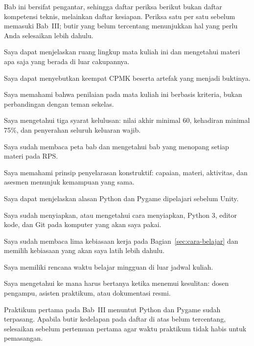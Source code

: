 
Bab ini bersifat pengantar, sehingga daftar periksa berikut bukan daftar
kompetensi teknis, melainkan daftar kesiapan. Periksa satu per satu sebelum
memasuki Bab~III; butir yang belum tercentang menunjukkan hal yang perlu Anda
selesaikan lebih dahulu.

\begin{checklistbox}
\begin{checklist}
  \item Saya dapat menjelaskan ruang lingkup mata kuliah ini dan mengetahui
        materi apa saja yang berada di luar cakupannya.
  \item Saya dapat menyebutkan keempat CPMK beserta artefak yang menjadi
        buktinya.
  \item Saya memahami bahwa penilaian pada mata kuliah ini berbasis kriteria,
        bukan perbandingan dengan teman sekelas.
  \item Saya mengetahui tiga syarat kelulusan: nilai akhir minimal 60,
        kehadiran minimal 75\%, dan penyerahan seluruh keluaran wajib.
  \item Saya sudah membaca peta bab dan mengetahui bab yang menopang setiap
        materi pada RPS.
  \item Saya memahami prinsip penyelarasan konstruktif: capaian, materi,
        aktivitas, dan asesmen menunjuk kemampuan yang sama.
  \item Saya dapat menjelaskan alasan Python dan Pygame dipelajari sebelum
        Unity.
  \item Saya sudah menyiapkan, atau mengetahui cara menyiapkan, Python 3,
        editor kode, dan Git pada komputer yang akan saya pakai.
  \item Saya sudah membaca lima kebiasaan kerja pada
        Bagian~\ref{sec:cara-belajar} dan memilih kebiasaan yang akan saya
        latih lebih dahulu.
  \item Saya memiliki rencana waktu belajar mingguan di luar jadwal kuliah.
  \item Saya mengetahui ke mana harus bertanya ketika menemui kesulitan:
        dosen pengampu, asisten praktikum, atau dokumentasi resmi.
\end{checklist}
\end{checklistbox}

\begin{catatabox}
Praktikum pertama pada Bab~III menuntut Python dan Pygame sudah terpasang.
Apabila butir kedelapan pada daftar di atas belum tercentang, selesaikan
sebelum pertemuan pertama agar waktu praktikum tidak habis untuk pemasangan.
\end{catatabox}
